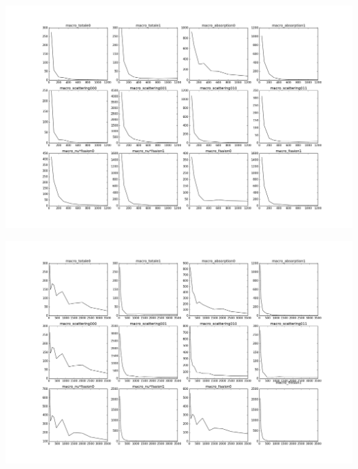 \begin{center}
\includegraphics[height= 9 cm,width = \linewidth]{images/UOX/Convergence_speed.png}
\end{center}

\begin{center}
\includegraphics[height= 9 cm,width = \linewidth]{images/UOX-Gd/Convergence_speed.png}
\label{figure:convergenceannexe}
\end{center}

\newpage


